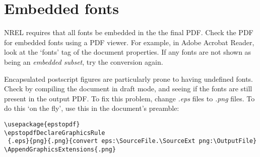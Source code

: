 \section{Embedded fonts}
NREL requires that all fonts be embedded in the the final PDF. Check the PDF for embedded fonts using a PDF viewer. For example, in Adobe Acrobat Reader, look at the `fonts' tag of the document properties. If any fonts are not shown as being an \emph{embedded subset}, try the conversion again. 

Encapsulated postscript figures are particularly prone to having undefined fonts. Check by compiling the document in draft mode, and seeing if the fonts are still present in the output PDF. To fix this problem, change \emph{.eps} files to \emph{.png} files. To do this `on the fly', use this in the document's preamble:

\begin{lstlisting}
\usepackage{epstopdf}
\epstopdfDeclareGraphicsRule
 {.eps}{png}{.png}{convert eps:\SourceFile.\SourceExt png:\OutputFile}
\AppendGraphicsExtensions{.png}
\end{lstlisting}